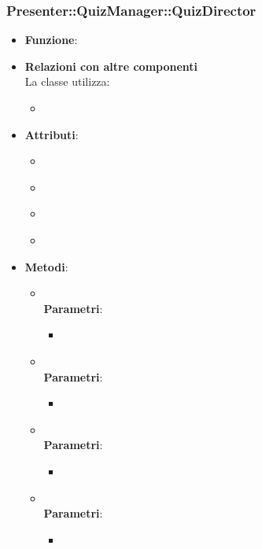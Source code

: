 \subsubsection{Presenter::QuizManager::QuizDirector}
\begin{itemize}
\item\textbf{Funzione}:
\item\textbf{Relazioni con altre componenti}\\
La classe utilizza:
	\begin{itemize}
		\item
	\end{itemize}
\item\textbf{Attributi}:
	\begin{itemize}
		\item\code{}\\
		\item\code{}\\
		\item\code{}\\
		\item\code{}\\
	\end{itemize}
\item\textbf{Metodi}:
	\begin{itemize}
		\item\code{}\\
		\textbf{Parametri}:
			\begin{itemize}
				\item\code{}\\
			\end{itemize}
		\item\code{}\\
		\textbf{Parametri}:
			\begin{itemize}
				\item\code{}\\
			\end{itemize}
		\item\code{}\\
		\textbf{Parametri}:
			\begin{itemize}
				\item\code{}\\
			\end{itemize}
		\item\code{}\\
		\textbf{Parametri}:
			\begin{itemize}
				\item\code{}\\
			\end{itemize}
	\end{itemize}
\end{itemize}

